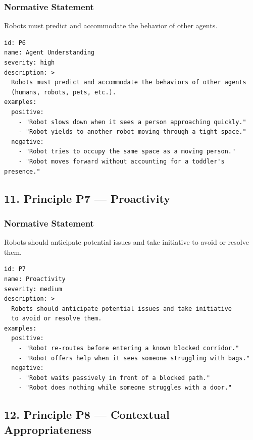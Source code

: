 \documentclass[utf8]{frontiers_suppmat} %
\begin{document}
\subsubsection{Normative Statement}\label{normative-statement-6}

Robots must predict and accommodate the behavior of other agents.

\begin{lstlisting}[style=literatecard, label={principle:p6}]
id: P6
name: Agent Understanding
severity: high
description: >
  Robots must predict and accommodate the behaviors of other agents
  (humans, robots, pets, etc.).
examples:
  positive:
    - "Robot slows down when it sees a person approaching quickly."
    - "Robot yields to another robot moving through a tight space."
  negative:
    - "Robot tries to occupy the same space as a moving person."
    - "Robot moves forward without accounting for a toddler's presence."
\end{lstlisting}

\subsection{11. Principle P7 ---
Proactivity}\label{principle-p7-proactivity}

\subsubsection{Normative Statement}\label{normative-statement-7}

Robots should anticipate potential issues and take initiative to avoid
or resolve them.

\begin{lstlisting}[style=literatecard, label={principle:p7}]
id: P7
name: Proactivity
severity: medium
description: >
  Robots should anticipate potential issues and take initiative
  to avoid or resolve them.
examples:
  positive:
    - "Robot re-routes before entering a known blocked corridor."
    - "Robot offers help when it sees someone struggling with bags."
  negative:
    - "Robot waits passively in front of a blocked path."
    - "Robot does nothing while someone struggles with a door."
\end{lstlisting}


\subsection{12. Principle P8 --- Contextual
Appropriateness}\label{principle-p8-contextual-appropriateness}
\end{document}
